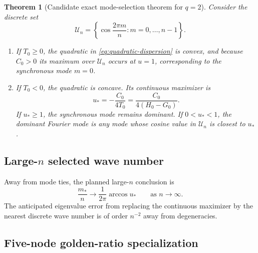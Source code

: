 \documentclass[11pt, reqno]{amsart}
\newtheorem{theorem}{Theorem}[section]
\theoremstyle{definition}
\theoremstyle{remark}
\begin{document}
	\begin{theorem}[Candidate exact mode-selection theorem for $q=2$]
		\label{thm:mode-selection}
		Consider the discrete set
		\[
		\mathcal U_n
		=
		\left\{\cos\frac{2\pi m}{n}:m=0,\ldots,n-1\right\}.
		\]
		\begin{enumerate}[label=(\roman*),leftmargin=2.5em]
			\item If $T_0\ge0$, the quadratic in
			\eqref{eq:quadratic-dispersion} is convex, and because $C_0>0$ its maximum
			over $\mathcal U_n$ occurs at $u=1$, corresponding to the synchronous mode
			$m=0$.
			
			\item If $T_0<0$, the quadratic is concave.  Its continuous maximizer is
			\begin{equation}
				\label{eq:u-star}
				u_*
				=-\frac{C_0}{4T_0}
				=\frac{C_0}{4(H_0-G_0)}.
			\end{equation}
			If $u_*\ge1$, the synchronous mode remains dominant.  If $0<u_*<1$, the
			dominant Fourier mode is any mode whose cosine value in $\mathcal U_n$ is
			closest to $u_*$.
		\end{enumerate}
	\end{theorem}
	
	
	\subsection{Large-$n$ selected wave number}
	
	Away from mode ties, the planned large-$n$ conclusion is
	\begin{equation}
		\label{eq:large-n-mode}
		\frac{m_*}{n}
		\longrightarrow
		\frac{1}{2\pi}\arccos u_*
		\qquad\text{as }n\to\infty.
	\end{equation}
	The anticipated eigenvalue error from replacing the continuous maximizer by the
	nearest discrete wave number is of order $n^{-2}$ away from degeneracies.
	
	
	\subsection{Five-node golden-ratio specialization}
	
\end{document}
